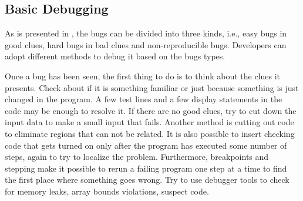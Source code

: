 \documentclass[draftclsnofoot,journal,onecolumn,12pt]{IEEEtran}
\begin{document}
\subsection{Basic Debugging}

As is presented in \cite{kernighan1999practice}, the bugs can be divided into three kinds, i.e., easy bugs in good clues, hard bugs in bad clues and non-reproducible bugs. Developers can adopt different methods to debug it based on the bugs types.

Once a bug has been seen, the first thing to do is to think about the clues it presents. Check about if it is something familiar or just because something is just changed in the program. A few test lines and a few display statements in the code may be enough to resolve it. If there are no good clues, try to cut down the input data to make a small input that fails. Another method is cutting out code to eliminate regions that can not be related. It is also possible to insert checking code that gets turned on only after the program has executed some number of steps, again to try to localize the problem. Furthermore, breakpoints and stepping make it possible to rerun a failing program one step at a time to find the first place where something goes wrong. Try to use debugger tools to check for memory leaks, array bounds violations, suspect code.
\end{document}
